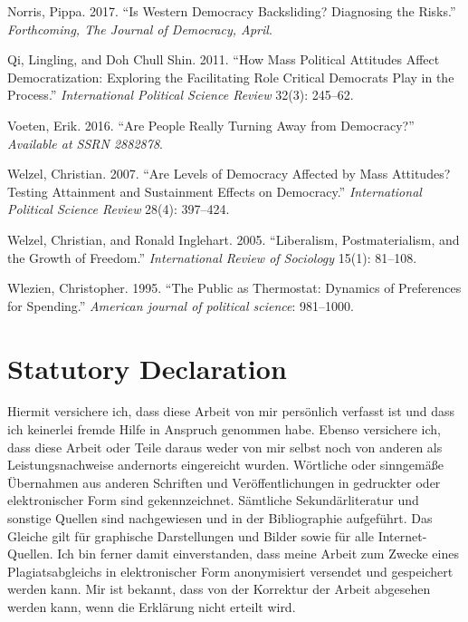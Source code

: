 \documentclass[12pt,english,a4paper,oneside]{article}
\newlength{\cslhangindent}
\newlength{\cslentryspacingunit} %
\newenvironment{CSLReferences}[2] %
 {%
  \setlength{\parindent}{0pt}
  \ifodd #1
  \let\oldpar\par
  \def\par{\hangindent=\cslhangindent\oldpar}
  \fi
  \setlength{\parskip}{#2\cslentryspacingunit}
 }%
 {}
\theoremstyle{definition}
\theoremstyle{definition}
\theoremstyle{definition}
\theoremstyle{definition}
\theoremstyle{remark}
\begin{document}
\begin{CSLReferences}{1}{0}
\leavevmode{}%
Norris, Pippa. 2017. {``Is Western Democracy Backsliding? Diagnosing the Risks.''} \emph{Forthcoming, The Journal of Democracy, April}.

\leavevmode{}%
Qi, Lingling, and Doh Chull Shin. 2011. {``How Mass Political Attitudes Affect Democratization: Exploring the Facilitating Role Critical Democrats Play in the Process.''} \emph{International Political Science Review} 32(3): 245--62.

\leavevmode{}%
Voeten, Erik. 2016. {``Are People Really Turning Away from Democracy?''} \emph{Available at SSRN 2882878}.

\leavevmode{}%
Welzel, Christian. 2007. {``Are Levels of Democracy Affected by Mass Attitudes? Testing Attainment and Sustainment Effects on Democracy.''} \emph{International Political Science Review} 28(4): 397--424.

\leavevmode{}%
Welzel, Christian, and Ronald Inglehart. 2005. {``Liberalism, Postmaterialism, and the Growth of Freedom.''} \emph{International Review of Sociology} 15(1): 81--108.

\leavevmode{}%
Wlezien, Christopher. 1995. {``The Public as Thermostat: Dynamics of Preferences for Spending.''} \emph{American journal of political science}: 981--1000.

\end{CSLReferences}

\clearpage

\hypertarget{statutory-declaration}{%
\section*{Statutory Declaration}\label{statutory-declaration}}

Hiermit versichere ich, dass diese Arbeit von mir persönlich verfasst ist und dass ich keinerlei fremde Hilfe in Anspruch genommen habe.
Ebenso versichere ich, dass diese Arbeit oder Teile daraus weder von mir selbst noch von anderen als Leistungsnachweise andernorts eingereicht wurden.
Wörtliche oder sinngemäße Übernahmen aus anderen Schriften und Veröffentlichungen in gedruckter oder elektronischer Form sind gekennzeichnet.
Sämtliche Sekundärliteratur und sonstige Quellen sind nachgewiesen und in der Bibliographie aufgeführt.
Das Gleiche gilt für graphische Darstellungen und Bilder sowie für alle Internet-Quellen.
Ich bin ferner damit einverstanden, dass meine Arbeit zum Zwecke eines Plagiatsabgleichs in elektronischer Form anonymisiert versendet und gespeichert werden kann.
Mir ist bekannt, dass von der Korrektur der Arbeit abgesehen werden kann, wenn die Erklärung nicht erteilt wird.
\end{document}
